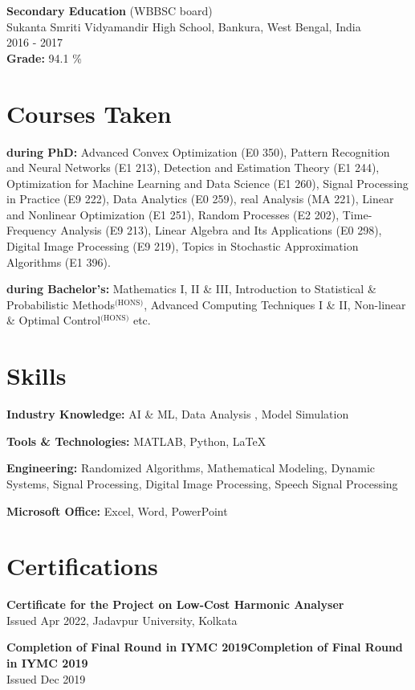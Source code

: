 \documentclass[a4paper,10pt]{article}
\begin{document}
\textbf{Secondary Education} (WBBSC board)\\
Sukanta Smriti Vidyamandir High School, Bankura, West Bengal, India \\
2016 - 2017  \\
\textbf{Grade:} 94.1 \%

\section*{Courses Taken}

\textbf{during PhD:}
Advanced Convex Optimization (E0 350), Pattern Recognition and Neural Networks (E1 213), Detection and Estimation Theory (E1 244), Optimization for Machine Learning and Data Science (E1 260), Signal Processing in Practice (E9 222), Data Analytics (E0 259), real Analysis (MA 221), Linear and Nonlinear Optimization (E1 251), Random Processes (E2 202), Time-Frequency Analysis (E9 213), Linear Algebra and Its Applications (E0 298), Digital Image Processing (E9 219), Topics in Stochastic Approximation Algorithms (E1 396).

\textbf{during Bachelor's:}
Mathematics I, II \& III, Introduction to Statistical \& Probabilistic Methods\(^{\text{(HONS)}}\), Advanced Computing Techniques I \& II, Non-linear \& Optimal Control\(^{\text{(HONS)}}\) etc.

\section*{Skills}
\textbf{Industry Knowledge:} AI \& ML, Data Analysis , Model Simulation

\textbf{Tools \& Technologies:} MATLAB, Python, \LaTeX

\textbf{Engineering:} Randomized Algorithms, Mathematical Modeling, Dynamic Systems, Signal Processing, Digital Image Processing, Speech Signal Processing

\textbf{Microsoft Office:} Excel, Word, PowerPoint

\section*{Certifications}
\textbf{Certificate for the Project on Low-Cost Harmonic Analyser} \\
Issued Apr 2022, Jadavpur University, Kolkata

\textbf{Completion of Final Round in IYMC 2019Completion of Final Round in IYMC 2019} \\ 
Issued Dec 2019
\end{document}

